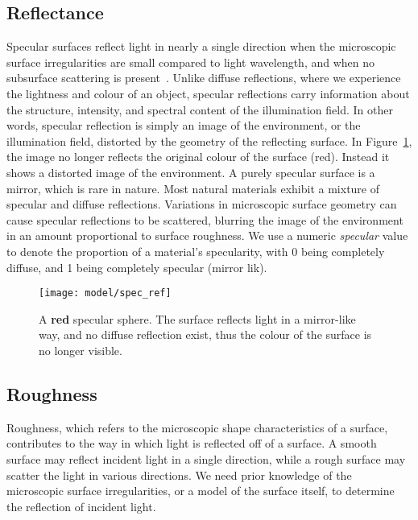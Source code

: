 
\subsection{Reflectance}
Specular surfaces reflect light in nearly a single direction when the microscopic surface irregularities are small compared to light wavelength, and when no subsurface scattering is present~\cite{nayar1989surface}. Unlike diffuse reflections, where we experience the lightness and colour of an object, specular reflections carry information about the structure, intensity, and spectral content of the illumination field. In other words, specular reflection is simply an image of the environment, or the illumination field, distorted by the geometry of the reflecting surface. In Figure~\ref{fig:spec_ref}, the image no longer reflects the original colour of the surface (red). Instead it shows a distorted image of the environment. A purely specular surface is a mirror, which is rare in nature. Most natural materials exhibit a mixture of specular and diffuse reflections. Variations in microscopic surface geometry can cause specular reflections to be scattered, blurring the image of the environment in an amount proportional to surface roughness. We use a numeric \textit{specular} value to denote the proportion of a material's specularity, with 0 being completely diffuse, and 1 being completely specular (mirror lik).
\begin{figure}[h]
\centering
\texttt{[image: model/spec\_ref]}
\caption{A \textbf{red} specular sphere. The surface reflects light in a mirror-like way, and no diffuse reflection exist, thus the colour of the surface is no longer visible.}
\label{fig:spec_ref}
\end{figure}

\subsection{Roughness}
Roughness, which refers to the microscopic shape characteristics of a surface, contributes to the way in which light is reflected off of a surface. A smooth surface may reflect incident light in a single direction, while a rough surface may scatter the light in various directions. We need prior knowledge of the microscopic surface irregularities, or a model of the surface itself, to determine the reflection of incident light.

